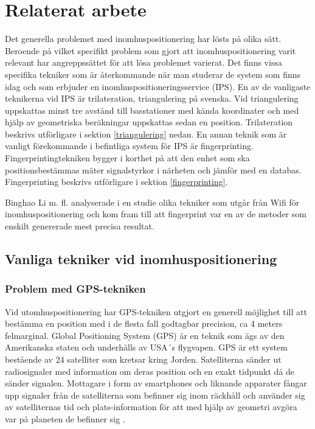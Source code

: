 \documentclass[swedish, a4paper,12pt]{article}
\begin{document}
\section{Relaterat arbete}
Det generella problemet med inomhuspositionering har lösts på olika sätt.
Beroende på vilket specifikt problem som gjort att inomhuspositionering varit relevant har angreppssättet för att lösa problemet varierat. Det finns vissa specifika tekniker som är återkommande när man studerar de system som finns idag och som erbjuder en inomhuspositioneringsservice (IPS)\cite{IP1}.
En av de vanligaste teknikerna vid IPS är trilateration\cite{cook2005indoor}, triangulering på svenska. Vid triangulering uppskattas minst tre avstånd till basstationer med kända koordinater och med hjälp av geometriska beräkningar uppskattas sedan en position. Trilateration beskrivs utförligare i sektion \ref{triangulering}
 nedan. En annan teknik som är vanligt förekommande i befintliga system för IPS är fingerprinting\cite{IP1}\cite{jun2018low}. Fingerprintingtekniken bygger i korthet på att den enhet som ska positionsbestämmas mäter signalstyrkor i närheten och jämför med en databas. Fingerprinting beskrivs utförligare i sektion \ref{fingerprinting}.

Binghao Li m. fl. analyserade i en studie \cite{IP1} olika tekniker som utgår från Wifi för inomhuspositionering och kom fram till att fingerprint var en av de metoder som enskilt genererade mest precisa resultat.

\subsection{Vanliga tekniker vid inomhuspositionering}

\subsubsection{Problem med GPS-tekniken}
Vid utomhuspositionering har GPS-tekniken utgjort en generell möjlighet till att bestämma en position med i de flesta fall godtagbar precision, ca 4 meters felmarginal\cite{GPS_US_ACCURACY}.
Global Positioning System (GPS) är en teknik som ägs av den Amerikanska staten och underhålls av USA´s flygvapen. GPS är ett system bestående av 24 satelliter som kretsar kring Jorden. Satelliterna sänder ut radiosignaler med information om deras position och en exakt tidpunkt då de sänder signalen. Mottagare i form av smartphones och liknande apparater fångar upp signaler från de satelliterna som befinner sig inom räckhåll och använder sig av satelliternas tid och plats-information för att med hjälp av geometri avgöra var på planeten de befinner sig \cite{GPS_US_HOW}.
\end{document}
